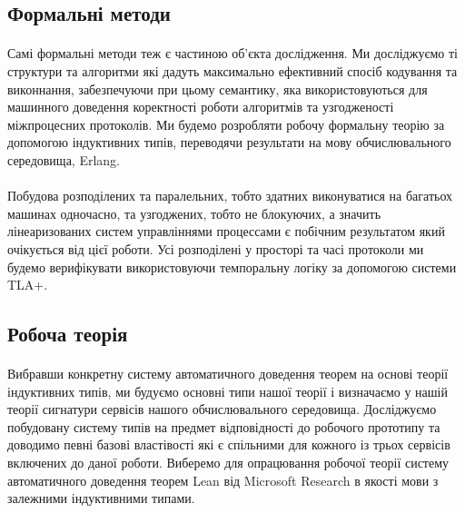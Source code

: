 \documentclass[11pt,oneside]{article}
\begin{document}
\newpage

\subsection*{Формальні методи}
\vspace{0.5cm}

   \paragraph{}
   Самі формальні методи теж є частиною об’єкта дослідження. Ми досліджуємо ті структури
   та алгоритми які дадуть максимально ефективний спосіб кодування та виконнання,
   забезпечуючи при цьому семантику, яка використовуються для машинного доведення
   коректності роботи алгоритмів та узгодженості міжпроцесних протоколів.
   Ми будемо розробляти робочу формальну теорію за допомогою індуктивних типів,
   переводячи результати на мову обчислювального середовища, Erlang.

   \paragraph{}
   Побудова розподілених та паралельних, тобто здатних виконуватися на багатьох машинах одночасно, та
   узгоджених, тобто не блокуючих, а значить лінеаризованих систем управліннями процессами є побічним
   результатом який очікується від цієї роботи. Усі розподілені у просторі та часі
   протоколи ми будемо верифікувати використовуючи темпоральну логіку за допомогою системи TLA+.

\subsection*{Робоча теорія}

   \paragraph{}
   Вибравши конкретну систему автоматичного доведення теорем на основі теорії індуктивних типів,
   ми будуємо основні типи нашої теорії і визначаємо у нашій теорії сигнатури сервісів
   нашого обчислювального середовища. Досліджуємо побудовану систему типів на предмет
   відповідності до робочого прототипу та доводимо певні базові властівості які є спільними для кожного із трьох
   сервісів включених до даної роботи. Виберемо для опрацювання робочої теорії
   систему автоматичного доведення теорем Lean від Microsoft Research в якості мови
   з залежними індуктивними типами.
\end{document}
